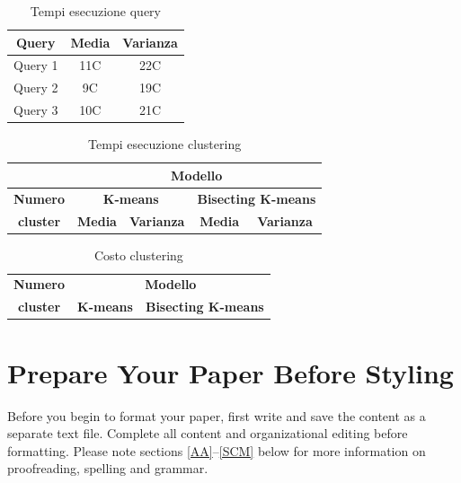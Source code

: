 \documentclass[conference]{IEEEtran}
\begin{document}
\begin{table}[htbp]
\caption{Tempi esecuzione query}
\begin{center}
    \begin{tabular}{|c|c|c|}
    \hline
    \textbf{Query} & \textbf{Media} & \textbf{Varianza}  \\ \hline
    Query 1 & 11C & 22C  \\ \hline
    Query 2 & 9C & 19C \\ \hline
    Query 3 & 10C & 21C  \\
    \hline
    \end{tabular}
\label{tab1}
\end{center}
\end{table}


\begin{table}[htbp]
\caption{Tempi esecuzione clustering}
\begin{center}
\begin{tabular}{|c|c|c|c|c|}
\hline
\textbf{}&\multicolumn{4}{|c|}{\textbf{Modello}} \\ \hline
\textbf{Numero} & \multicolumn{2}{|c|}{\textbf{K-means}} & \multicolumn{2}{|c|}{\textbf{Bisecting K-means}} \\ \cline{2-5} 
\textbf{cluster} & \textbf{Media} & \textbf{Varianza} & \textbf{Media} & \textbf{Varianza} \\ \hline

\end{tabular}
\label{tab2}
\end{center}
\end{table}

\begin{table}[htbp]
\caption{Costo clustering}
\begin{center}
\begin{tabular}{|c|c|c|}
\hline
\textbf{Numero}&\multicolumn{2}{|c|}{\textbf{Modello}} \\ \cline{2-3}
\textbf{cluster} & \multicolumn{1}{|c|}{\textbf{K-means}} & \multicolumn{1}{|c|}{\textbf{Bisecting K-means}} \\ \hline

\end{tabular}
\label{tab3}
\end{center}
\end{table}

\section{Prepare Your Paper Before Styling}
Before you begin to format your paper, first write and save the content as a 
separate text file. Complete all content and organizational editing before 
formatting. Please note sections \ref{AA}--\ref{SCM} below for more information on 
proofreading, spelling and grammar.
\end{document}
